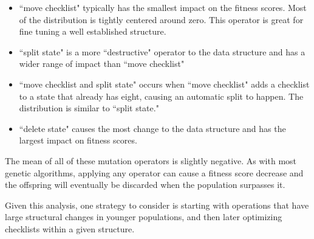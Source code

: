 \documentclass[3p,times,procedia]{elsarticle}
\begin{document}
\begin{itemize}
  \item ``move checklist" typically has the smallest impact on the fitness scores. Most of the distribution is tightly centered around zero. This operator is great for fine tuning a well established structure. 
  \item ``split state" is a more ``destructive" operator to the data structure and has a wider range of impact than ``move checklist"
  \item ``move checklist and split state" occurs when ``move checklist" adds a  checklist to a state that already has eight, causing an automatic split to happen. The distribution is similar to ``split state."
  \item ``delete state" causes the most change to the data structure and has the largest impact on fitness scores. 
\end{itemize}

The mean of all of these mutation operators is slightly negative. As with most genetic algorithms, applying any operator can cause a fitness score decrease and the offspring will eventually be discarded when the population surpasses it. 

Given this analysis, one strategy to consider is starting with operations that have large structural changes in younger populations, and then later optimizing checklists within a given structure.



\end{document}
